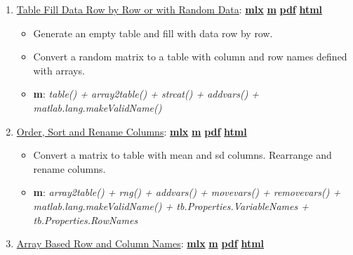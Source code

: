 \documentclass[
]{book}
\providecommand{\tightlist}{%
  \setlength{\itemsep}{0pt}\setlength{\parskip}{0pt}}
\begin{document}
\begin{enumerate}
\def\labelenumi{\arabic{enumi}.}
\tightlist
\item
  \href{https://fanwangecon.github.io/M4Econ/table/main/htmlpdfm/fs_tab_gensample.html}{Table Fill Data Row by Row or with Random Data}: \href{https://github.com/FanWangEcon/M4Econ/blob/master/table/main/fs_tab_gensample.mlx}{\textbf{mlx}} \textbar{} \href{https://github.com/FanWangEcon/M4Econ/blob/master/table/main/htmlpdfm/fs_tab_gensample.m}{\textbf{m}} \textbar{} \href{https://github.com/FanWangEcon/M4Econ/blob/master/table/main/htmlpdfm/fs_tab_gensample.pdf}{\textbf{pdf}} \textbar{} \href{https://fanwangecon.github.io/M4Econ/table/main/htmlpdfm/fs_tab_gensample.html}{\textbf{html}}

  \begin{itemize}
  \tightlist
  \item
    Generate an empty table and fill with data row by row.
  \item
    Convert a random matrix to a table with column and row names defined with arrays.
  \item
    \textbf{m}: \emph{table() + array2table() + strcat() + addvars() + matlab.lang.makeValidName()}
  \end{itemize}
\item
  \href{https://fanwangecon.github.io/M4Econ/table/main/htmlpdfm/fs_tab_ordersort.html}{Order, Sort and Rename Columns}: \href{https://github.com/FanWangEcon/M4Econ/blob/master/table/main/fs_tab_ordersort.mlx}{\textbf{mlx}} \textbar{} \href{https://github.com/FanWangEcon/M4Econ/blob/master/table/main/htmlpdfm/fs_tab_ordersort.m}{\textbf{m}} \textbar{} \href{https://github.com/FanWangEcon/M4Econ/blob/master/table/main/htmlpdfm/fs_tab_ordersort.pdf}{\textbf{pdf}} \textbar{} \href{https://fanwangecon.github.io/M4Econ/table/main/htmlpdfm/fs_tab_ordersort.html}{\textbf{html}}

  \begin{itemize}
  \tightlist
  \item
    Convert a matrix to table with mean and sd columns. Rearrange and rename columns.
  \item
    \textbf{m}: \emph{array2table() + rng() + addvars() + movevars() + removevars() + matlab.lang.makeValidName() + tb.Properties.VariableNames + tb.Properties.RowNames}
  \end{itemize}
\item
  \href{https://fanwangecon.github.io/M4Econ/table/main/htmlpdfm/fs_tab_rowcolstrs.html}{Array Based Row and Column Names}: \href{https://github.com/FanWangEcon/M4Econ/blob/master/table/main/fs_tab_rowcolstrs.mlx}{\textbf{mlx}} \textbar{} \href{https://github.com/FanWangEcon/M4Econ/blob/master/table/main/htmlpdfm/fs_tab_rowcolstrs.m}{\textbf{m}} \textbar{} \href{https://github.com/FanWangEcon/M4Econ/blob/master/table/main/htmlpdfm/fs_tab_rowcolstrs.pdf}{\textbf{pdf}} \textbar{} \href{https://fanwangecon.github.io/M4Econ/table/main/htmlpdfm/fs_tab_rowcolstrs.html}{\textbf{html}}


\end{enumerate}
\end{document}

